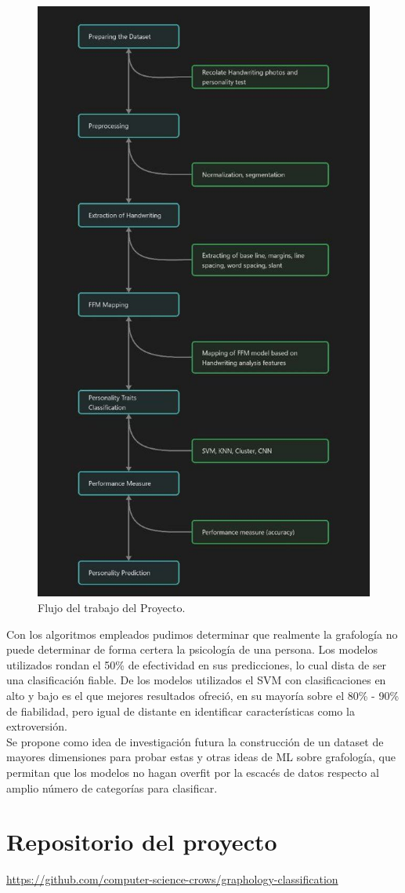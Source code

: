 \documentclass[10pt, a4paper]{article}
\begin{document}
        \begin{figure}[H]
            \centering
            \includegraphics[width = 0.5\linewidth]{photo_2023-05-29_02-40-00.jpg}
            \caption{Flujo del trabajo del Proyecto.}
        \end{figure}


        Con los algoritmos empleados pudimos determinar que realmente la grafolog\'ia no puede determinar de 
        forma certera la psicolog\'ia de una persona. Los modelos utilizados rondan el 50\% de efectividad en sus predicciones, 
        lo cual dista de ser una clasificaci\'on fiable. De los modelos utilizados el SVM con clasificaciones en alto y bajo es el que mejores 
        resultados ofreci\'o, en su mayor\'ia sobre el 80\% - 90\% de fiabilidad, pero igual de distante en identificar caracter\'isticas como la extroversi\'on.\\ 

        Se propone como idea de investigaci\'on futura la construcci\'on de un dataset de mayores dimensiones para probar estas y otras ideas de ML sobre grafolog\'ia, que 
        permitan que los modelos no hagan overfit por la escac\'es de datos respecto al amplio n\'umero de categor\'ias para clasificar. 

        \section{Repositorio del proyecto}
		\begin{center}
			\small \url{https://github.com/computer-science-crows/graphology-classification}
		\end{center}
\end{document}
